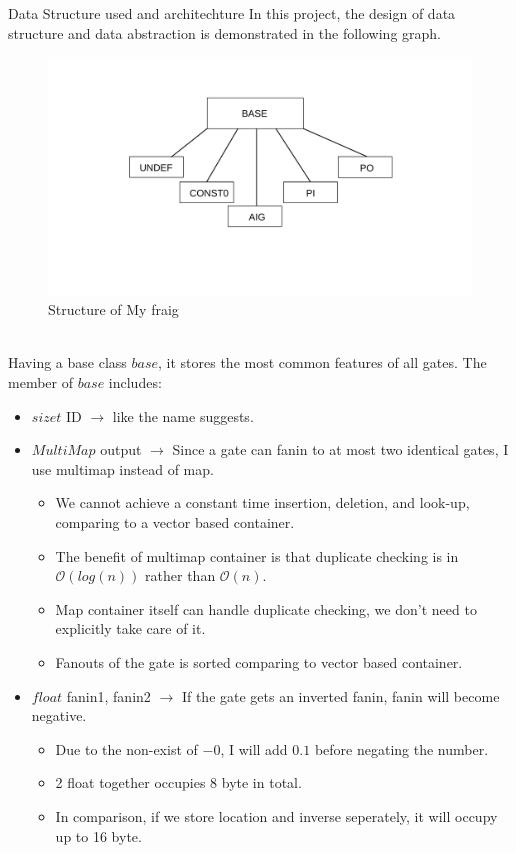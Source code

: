 \documentclass[12pt,a4paper]{report}
\begin{document}
\begin{section}{Data Structure used and architechture}
In this project, the design of data structure and data abstraction is demonstrated in the following graph.
\begin{figure}[h!]
  \includegraphics[scale=0.55,trim={1cm 3cm 0 10px} ]{architect.pdf}
  \caption{Structure of My fraig}
\end{figure}\\
Having a base class $base$, it stores the most common features of all gates. The member of $base$ includes:
\begin{itemize}
  \item $sizet$ ID $\rightarrow$ like the name suggests.
  \item $MultiMap$ output $\rightarrow$ Since a gate can fanin to at most two identical gates, I use multimap instead of map.
  \begin{itemize}
    \item We cannot achieve a constant time insertion, deletion, and look-up, comparing 
    to a vector based container.
    \item The benefit of multimap container is that duplicate checking is 
    in $\mathcal{O}(log(n))$ rather than $\mathcal{O}(n)$.
    \item Map container itself can handle duplicate checking, we don't need to explicitly take care of it.
    \item Fanouts of the gate is sorted comparing to vector based container.
  \end{itemize} 
  \item $float$ fanin1, fanin2 $\rightarrow$ If the gate gets an inverted fanin, fanin will become negative.
  \begin{itemize}
    \item Due to the non-exist of $-0$, I will add $0.1$ before negating the number.
    \item 2 float together occupies 8 byte in total. 
    \item In comparison, if we store location and inverse seperately, it will occupy up to 16 byte.
  \end{itemize}
  

\end{itemize}
\end{section}
\end{document}
